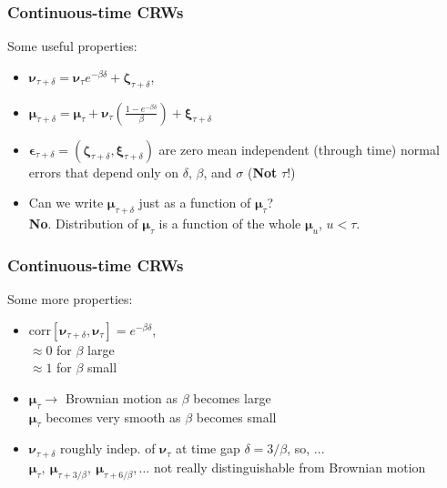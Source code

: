 \documentclass[36pt,handout]{beamer}
\newcommand{\ft}[1]{\frametitle{#1}}
\newcommand{\bigsep}{\itemsep=1.5\baselineskip}
\newcommand{\bmu}{\boldsymbol{\mu}}
\newcommand{\be}{\boldsymbol{\epsilon}}
\newcommand{\bv}{\boldsymbol{\nu}}
\begin{document}

\begin{frame}
\ft{Continuous-time CRWs}
Some useful properties: 
\medskip

\begin{itemize}
\bigsep
\item $\bv_{\tau+\delta} = \bv_\tau e^{-\beta\delta} + \boldsymbol{\zeta}_{\tau+\delta}$, 
\item $\bmu_{\tau+\delta} = \bmu_\tau + \bv_\tau\left(\frac{1-e^{-\beta\delta}}{\beta}\right) + \boldsymbol{\xi}_{\tau+\delta}$
\item $\be_{\tau+\delta} = (\boldsymbol{\zeta}_{\tau+\delta}, \boldsymbol{\xi}_{\tau+\delta})$ are zero mean independent (through time) normal errors that depend only on $\delta$, $\beta$, and $\sigma$ ({\bf Not} $\tau$!) 
\item Can we write $\bmu_{\tau+\delta}$ just as a function of $\bmu_\tau$? \medskip \\
{\bf No}. Distribution of $\bmu_\tau$ is a function of the whole $\bmu_u$, $u<\tau$.
\end{itemize}
\vfill
\end{frame}


\begin{frame}
\ft{Continuous-time CRWs}
Some more properties: 
\medskip

\begin{itemize}
\bigsep
\item $\mbox{corr}[\bv_{\tau+\delta},\bv_\tau] = e^{-\beta\delta}$,\\
$\approx 0$ for $\beta$ large\\
$\approx 1$ for $\beta$ small
\item $\bmu_\tau \to$ Brownian motion as $\beta$ becomes large\\
$\bmu_\tau$ becomes very smooth as $\beta$ becomes small
\item $\bv_{\tau+\delta}$ roughly indep. of $\bv_\tau$ at time gap $\delta = 3/\beta$, so, ...\medskip \\
$\bmu_\tau,\ \bmu_{\tau+3/\beta},\ \bmu_{\tau+6/\beta},\dots$ not really distinguishable from Brownian motion
\end{itemize}
\vfill
\end{frame}
\end{document}
